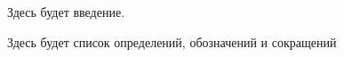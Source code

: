 \documentclass[bachelor, och, coursework]{SCWorks}
\begin{document}


\tableofcontents

\intro

    Здесь будет введение.


    Здесь будет список определений, обозначений и сокращений








\end{document}
